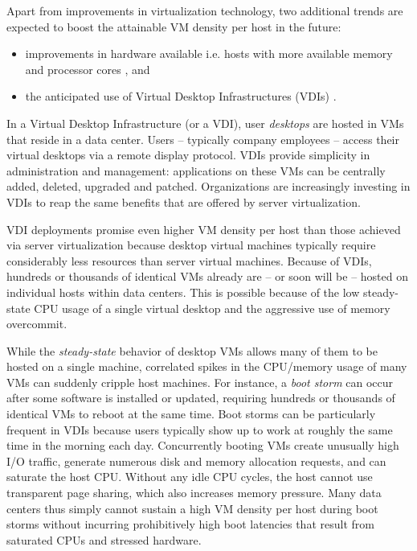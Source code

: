 Apart from improvements in virtualization technology, two additional trends 
are expected to boost the attainable VM density per host in the future:
\begin{itemize}
\item improvements in hardware available i.e. hosts with
more available memory and processor cores \cite{hansen2010lithium},
and 
\item the anticipated use of Virtual Desktop Infrastructures (VDIs) \cite{vmwarevdi}.
\end{itemize}

In a Virtual Desktop Infrastructure (or a VDI), user {\em desktops} are hosted in
VMs that reside in a data center. 
Users -- typically company employees -- access their virtual desktops via a remote display protocol. 
VDIs provide simplicity in administration and management: applications on 
these VMs can be centrally added, deleted, upgraded and patched. 
Organizations are increasingly investing in VDIs to reap the same benefits
that are offered by server virtualization.

VDI deployments promise even higher VM density per
host than those achieved via server virtualization
because desktop virtual machines typically require
considerably less resources than server virtual machines.
Because of VDIs, hundreds or thousands of identical VMs already are -- or soon
will be -- hosted on individual hosts within data centers.
This is possible because of the low steady-state CPU
usage of a single virtual desktop and the aggressive
use of memory overcommit.

While the {\em steady-state} behavior of desktop VMs
allows many of them to be hosted on a single machine,
correlated spikes in the CPU/memory usage of many VMs can suddenly 
cripple host machines. For instance, a \emph{boot storm} \cite{hansen2010lithium, 
liao2011vmstore, meng2010tide, rajan2010vdc, vaghani2010virtual}
can occur after some software is installed or updated, requiring hundreds 
or thousands of identical VMs to reboot at the same time.
Boot storms can be particularly frequent in VDIs because users typically show up to
work at roughly the same time in the morning each day. 
Concurrently booting VMs create unusually high I/O traffic,
generate numerous disk and memory allocation requests,
and can saturate the host CPU. 
Without any idle CPU cycles, the host cannot use transparent page sharing,
which also increases memory pressure.
Many data centers thus simply cannot sustain a high VM density 
per host during boot storms without incurring
prohibitively high boot latencies that result
from saturated CPUs and stressed hardware.

